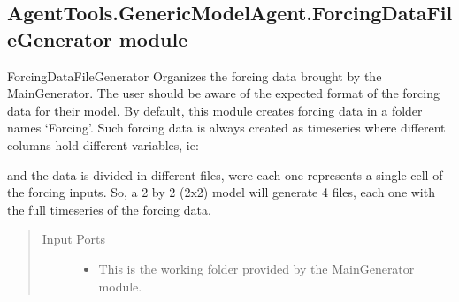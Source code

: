 \documentclass[letterpaper,10pt,english]{sphinxmanual}
\begin{document}
\subsection{AgentTools.GenericModelAgent.ForcingDataFileGenerator module}
\label{\detokenize{AgentTools.GenericModelAgent:module-AgentTools.GenericModelAgent.ForcingDataFileGenerator}}\label{\detokenize{AgentTools.GenericModelAgent:agenttools-genericmodelagent-forcingdatafilegenerator-module}}

\begin{fulllineitems}
\label{\detokenize{AgentTools.GenericModelAgent:AgentTools.GenericModelAgent.ForcingDataFileGenerator.ForcingDataFileGenerator}}
ForcingDataFileGenerator Organizes the forcing data brought by the MainGenerator. 
The user should be aware of the expected format of the forcing data for their model.
By default, this module creates forcing data in a folder names ‘Forcing’. Such forcing data is 
always created as timeseries where different columns hold different variables, ie:
\begin{quote}




\end{quote}

and the data is divided in different files, were each one represents a single cell of the forcing inputs. 
So, a 2 by 2 (2x2) model will generate 4 files, each one with the full timeseries of the forcing data.
\begin{quote}\begin{description}
\item[{Input Ports}] \leavevmode\begin{itemize}
\item {} 
 This is the working folder provided by the MainGenerator module.


\end{itemize}
\end{description}
\end{quote}
\end{fulllineitems}
\end{document}
